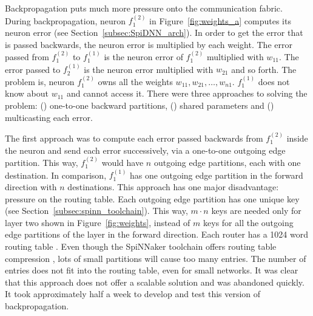 \documentclass[]{article}
\begin{document}
Backpropagation puts much more pressure onto the communication
fabric.
During backpropagation, neuron $f^{(2)}_1$ in
Figure~\ref{fig:weights_a} computes its neuron error (see
Section~\ref{subsec:SpiDNN_arch}).
In order to get the error that is passed backwards, the neuron error
is multiplied by each weight.
The error passed from $f^{(2)}_1$ to $f^{(1)}_1$ is the neuron error
of $f^{(2)}_1$ multiplied with $w_{11}$.
The error passed to $f^{(1)}_2$ is the neuron error multiplied with
$w_{21}$ and so forth.
The problem is, neuron $f^{(2)}_1$ owns all the weights
$w_{11}, w_{21}, \dots, w_{n1}$.
$f^{(1)}_1$ does not know about $w_{11}$ and cannot access it.
There were three approaches to solving the problem:
() one-to-one backward partitions,
() shared parameters and ()
multicasting each error.

The first approach was to compute each error passed backwards
from $f^{(2)}_1$ inside the neuron and send each error successively,
via a one-to-one outgoing edge partition.
This way, $f^{(2)}_1$ would have $n$ outgoing edge partitions, each
with one destination.
In comparison, $f^{(1)}_1$ has one outgoing edge partition in the
forward direction with $n$ destinations.
This approach has one major disadvantage: pressure on the routing
table.
Each outgoing edge partition has one unique key
(see Section~\ref{subsec:spinn_toolchain}).
This way, $m \cdot n$ keys are needed only for layer two shown in
Figure~\ref{fig:weights}, instead of
$m$ keys for all the outgoing edge partitions of the layer in the
forward direction.
Each router has a 1024 word routing table
\citep{navaridas_et_al_2009}.
Even though the SpiNNaker toolchain offers routing table compression
\citep{heathcote_2016}, lots of small partitions will cause too many
entries.
The number of entries does not fit into the routing table, even for
small networks.
It was clear that this approach does not offer a scalable solution
and was abandoned quickly.
It took approximately half a week to develop and test this version of
backpropagation.
\end{document}
